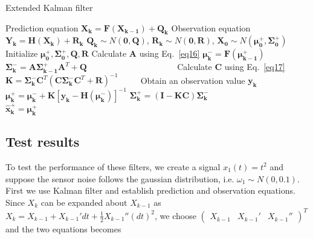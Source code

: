 \documentclass[conference]{IEEEtran}
\begin{document}
	\begin{algorithm}
		\caption{Extended Kalman filter}
		\begin{algorithmic}  
			\STATE Prediction equation $\boldsymbol{X_{k}}=\boldsymbol{F}(\boldsymbol{X_{k-1}})+\boldsymbol{Q_{k}}$
			\STATE Observation equation $\boldsymbol{Y_{k}}=\boldsymbol{H}(\boldsymbol{X_{k}})+\boldsymbol{R_{k}}$
			\STATE $\boldsymbol{Q_{k}}\sim N(\boldsymbol{0},\boldsymbol{Q})$, $\boldsymbol{R_{k}}\sim N(\boldsymbol{0},\boldsymbol{R})$, $\boldsymbol{X_{0}}\sim N(\boldsymbol{\mu_{0}^{+}}, \boldsymbol{\Sigma_{0}^{+}})$
			\STATE Initialize $ \boldsymbol{\mu_{0}^{+}}, \boldsymbol{\Sigma_{0}^{+}}, \boldsymbol{Q}, \boldsymbol{R}$
			\STATE Calculate $\boldsymbol{A}$ using Eq.~\ref{eq16}
			\STATE $\boldsymbol{\mu_{k}^{-}}=\boldsymbol{F}(\boldsymbol{\mu_{k-1}^{+}})$ 
			\STATE $\boldsymbol{\Sigma_{k}^{-}}=\boldsymbol{A}\boldsymbol{\Sigma_{k-1}^{+}}\boldsymbol{A}^{T}+\boldsymbol{Q}$ \ \ \ \ \ \ \ \ \ \ \ \ \ \ \ \ \ \ \ \ 
			\STATE Calculate $\boldsymbol{C}$ using Eq.~\ref{eq17}
			\STATE $\boldsymbol{K}=\boldsymbol{\Sigma_{k}^{-}}\boldsymbol{C}^{T}(\boldsymbol{C}\boldsymbol{\Sigma_{k}^{-}}\boldsymbol{C}^{T}+\boldsymbol{R})^{-1}$ \ \ \ \ 	
			\STATE Obtain an observation value $\boldsymbol{y_{k}}$
			\STATE $\boldsymbol{\mu_{k}^{+}}=\boldsymbol{\mu_{k}^{-}}+\boldsymbol{K}[\boldsymbol{y_{k}}-\boldsymbol{H}(\boldsymbol{\mu_{k}^{-}})]^{-1}$
			\STATE $\boldsymbol{\Sigma_{k}^{+}}=(\boldsymbol{I}-\boldsymbol{KC})\boldsymbol{\Sigma_{k}^{-}}$ \ \ \ \ \ \ \ \ \ \ \ \ \ \ \ \ \ \ \ \ \ \ \ 
			\STATE $\boldsymbol{\hat{x}_{k}^{+}}=\boldsymbol{\mu_{k}^{+}}$
			\ENDFOR
		\end{algorithmic}
	\end{algorithm}
	
	\subsection{Test results}
	
	To test the performance of these filters, we create a signal $x_{1}(t)=t^{2}$ and suppose the sensor noise follows the gaussian distribution, i.e. $\omega_{1} \sim N(0,0.1)$. First we use Kalman filter and establish prediction and observation equations. Since $X_{k}$ can be expanded about $X_{k-1}$ as $X_{k}=X_{k-1}+{X_{k-1}}'dt+\frac{1}{2}{X_{k-1}}''(dt)^{2}$, we choose $\begin{pmatrix}
	X_{k-1} &{X_{k-1}}'  &{X_{k-1}}'' 
	\end{pmatrix}^{T}$ and the two equations becomes
	
\end{document}

